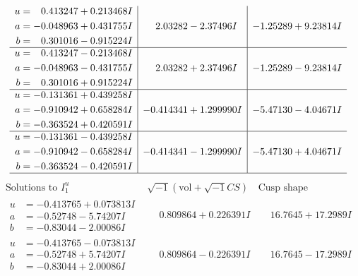 \documentclass[1p]{elsarticle_modified}
\theoremstyle{definition}
\newcommand{\I}{\sqrt{-1}}
\begin{document}
$$\begin{array}{c|c|c}
\begin{aligned}
u &= \phantom{-}0.413247 + 0.213468 I \\
a &= -0.048963 + 0.431755 I \\
b &= \phantom{-}0.301016 - 0.915224 I\end{aligned}
 & \phantom{-}2.03282 - 2.37496 I & -1.25289 + 9.23814 I \\ \hline\begin{aligned}
u &= \phantom{-}0.413247 - 0.213468 I \\
a &= -0.048963 - 0.431755 I \\
b &= \phantom{-}0.301016 + 0.915224 I\end{aligned}
 & \phantom{-}2.03282 + 2.37496 I & -1.25289 - 9.23814 I \\ \hline\begin{aligned}
u &= -0.131361 + 0.439258 I \\
a &= -0.910942 + 0.658284 I \\
b &= -0.363524 + 0.420591 I\end{aligned}
 & -0.414341 + 1.299990 I & -5.47130 - 4.04671 I \\ \hline\begin{aligned}
u &= -0.131361 - 0.439258 I \\
a &= -0.910942 - 0.658284 I \\
b &= -0.363524 - 0.420591 I\end{aligned}
 & -0.414341 - 1.299990 I & -5.47130 + 4.04671 I\\
 \hline 
 \end{array}$$\newpage$$\begin{array}{c|c|c}  
\text{Solutions to }I^u_{1}& \I (\text{vol} + \sqrt{-1}CS) & \text{Cusp shape}\\
 \hline 
\begin{aligned}
u &= -0.413765 + 0.073813 I \\
a &= -0.52748 - 5.74207 I \\
b &= -0.83044 - 2.00086 I\end{aligned}
 & \phantom{-}0.809864 + 0.226391 I & \phantom{-}16.7645 + 17.2989 I \\ \hline\begin{aligned}
u &= -0.413765 - 0.073813 I \\
a &= -0.52748 + 5.74207 I \\
b &= -0.83044 + 2.00086 I\end{aligned}
 & \phantom{-}0.809864 - 0.226391 I & \phantom{-}16.7645 - 17.2989 I \\ \hline\begin{aligned}

\end{aligned}
\end{array}$$
\end{document}
